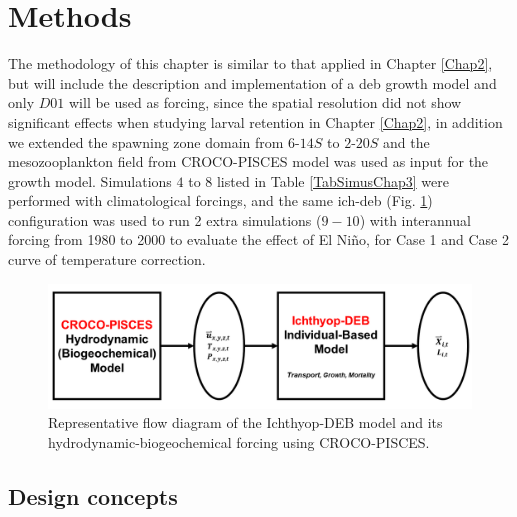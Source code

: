 \section{Methods}\label{Chap3Meth}
The methodology of this chapter is similar to that applied in Chapter \ref{Chap2}, but will include the description and implementation of a \acrshort{deb} growth model and only $D01$ will be used as forcing, since the spatial resolution did not show significant effects when studying larval
retention in Chapter \ref{Chap2}, in addition we extended the spawning zone domain from $6$\textdegree -$14$\textdegree $S$ to $2$\textdegree -$20$\textdegree $S$ and the mesozooplankton field from CROCO-PISCES model was used as input for the growth model. Simulations $4$ to $8$ listed in Table \ref{TabSimusChap3} were performed with climatological forcings, and the same \gls{ich-deb} (Fig. \ref{Chap3Ichthyop-DEB}) configuration was used to run 2 extra simulations ($9-10$) with interannual forcing from 1980 to 2000 to evaluate the effect of El Ni\~{n}o, for Case 1 and Case 2 curve of temperature correction.\\

\begin{figure}[ht]
	\includegraphics[width=1.0\textwidth]{figures/Chap3Ichthyop-DEB.png}
	\centering
	\caption{Representative flow diagram of the Ichthyop-DEB model and its hydrodynamic-biogeochemical forcing using CROCO-PISCES.}
	\label{Chap3Ichthyop-DEB}
\end{figure}

\subsection{Design concepts}

